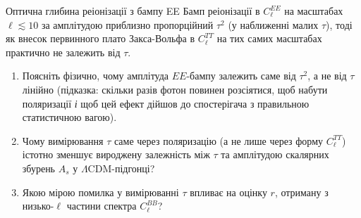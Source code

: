 
\begin{problem}{Оптична глибина реіонізації з бампу EE}
Бамп реіонізації в $C_\ell^{EE}$ на масштабах $\ell \lesssim 10$
за амплітудою приблизно пропорційний $\tau^2$ (у наближенні малих
$\tau$), тоді як внесок первинного плато Закса-Вольфа в $C_\ell^{TT}$
на тих самих масштабах практично не залежить від $\tau$.
\begin{enumerate}
    \item Поясніть фізично, чому амплітуда $EE$-бампу залежить саме
          від $\tau^2$, а не від $\tau$ лінійно (підказка: скільки
          разів фотон повинен розсіятися, щоб набути поляризації
          \emph{і} щоб цей ефект дійшов до спостерігача з правильною
          статистичною вагою).
    \item Чому вимірювання $\tau$ саме через поляризацію (а не лише
          через форму $C_\ell^{TT}$) істотно зменшує вироджену
          залежність між $\tau$ та амплітудою скалярних збурень $A_s$
          у $\Lambda$CDM-підгонці?
    \item Якою мірою помилка у вимірюванні $\tau$ впливає на оцінку
          $r$, отриману з низько-$\ell$ частини спектра $C_\ell^{BB}$?
\end{enumerate}
\end{problem}

